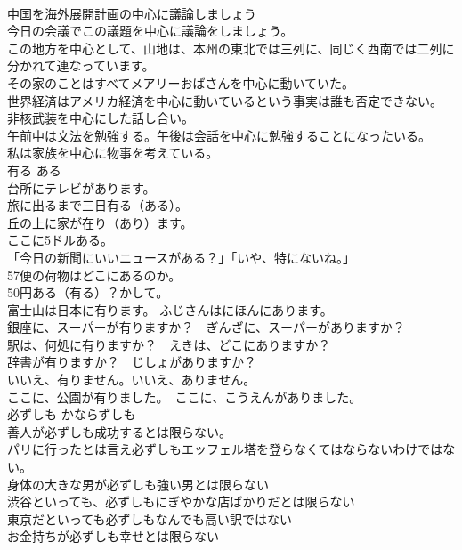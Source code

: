 \documentclass[8pt]{extreport}
\begin{document}
\begin{CJK}{UTF8}{min}
\\	中国を海外展開計画の中心に議論しましょう  
\\	今日の会議でこの議題を中心に議論をしましょう。  
\\	この地方を中心として、山地は、本州の東北では三列に、同じく西南では二列に分かれて連なっています。  
\\	その家のことはすべてメアリーおばさんを中心に動いていた。   
\\	世界経済はアメリカ経済を中心に動いているという事実は誰も否定できない。   
\\	非核武装を中心にした話し合い。   
\\	午前中は文法を勉強する。午後は会話を中心に勉強することになったいる。  
\\	私は家族を中心に物事を考えている。   
\\	有る	ある	
\\	台所にテレビがあります。
\\	旅に出るまで三日有る（ある）。  
\\	丘の上に家が在り（あり）ます。  
\\	ここに5ドルある。
\\	「今日の新聞にいいニュースがある？」「いや、特にないね。」
\\	57便の荷物はどこにあるのか。
\\	50円ある（有る）？かして。
\\	富士山は日本に有ります。 ふじさんはにほんにあります。   
\\	銀座に、スーパーが有りますか？　ぎんざに、スーパーがありますか？   
\\	駅は、何処に有りますか？　えきは、どこにありますか？   
\\	辞書が有りますか？　じしょがありますか？   
\\	いいえ、有りません。いいえ、ありません。   
\\	ここに、公園が有りました。　ここに、こうえんがありました。  
\\	必ずしも	かならずしも	
\\	善人が必ずしも成功するとは限らない。  
\\	パリに行ったとは言え必ずしもエッフェル塔を登らなくてはならないわけではない。  
\\	身体の大きな男が必ずしも強い男とは限らない  
\\	渋谷といっても、必ずしもにぎやかな店ばかりだとは限らない  
\\	東京だといっても必ずしもなんでも高い訳ではない  
\\	お金持ちが必ずしも幸せとは限らない  

\end{CJK}
\end{document}
